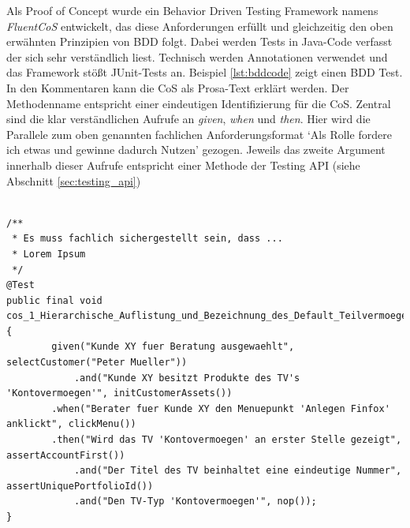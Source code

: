 Als Proof of Concept wurde ein Behavior Driven Testing Framework namens \textit{FluentCoS} entwickelt, das diese Anforderungen erfüllt und gleichzeitig den oben erwähnten Prinzipien von \Gls{BDD} folgt. Dabei werden Tests in Java-Code verfasst der sich sehr verständlich liest. Technisch werden Annotationen verwendet und das Framework stößt JUnit-Tests an. Beispiel \ref{lst:bddcode} zeigt einen \Gls{BDD} Test. In den Kommentaren kann die \Gls{CoS} als Prosa-Text erklärt werden. Der Methodenname entspricht einer eindeutigen Identifizierung für die CoS. Zentral sind die klar verständlichen Aufrufe an \textit{given}, \textit{when} und \textit{then}. Hier wird die Parallele zum oben genannten fachlichen Anforderungsformat `Als Rolle fordere ich etwas und gewinne dadurch Nutzen' gezogen. Jeweils das zweite Argument innerhalb dieser Aufrufe entspricht einer Methode der Testing API (siehe Abschnitt \ref{sec:testing_api})

\begin{lstlisting}[caption={Beispielhaftes Codestück eines \Gls{BDD} Tests},label=lst:bddcode]

/**
 * Es muss fachlich sichergestellt sein, dass ...
 * Lorem Ipsum
 */
@Test
public final void cos_1_Hierarchische_Auflistung_und_Bezeichnung_des_Default_Teilvermoegens_Kontovermoegen() {
		given("Kunde XY fuer Beratung ausgewaehlt", selectCustomer("Peter Mueller"))
			.and("Kunde XY besitzt Produkte des TV's 'Kontovermoegen'", initCustomerAssets())
		.when("Berater fuer Kunde XY den Menuepunkt 'Anlegen Finfox' anklickt", clickMenu())
		.then("Wird das TV 'Kontovermoegen' an erster Stelle gezeigt", assertAccountFirst())
			.and("Der Titel des TV beinhaltet eine eindeutige Nummer", assertUniquePortfolioId())
			.and("Den TV-Typ 'Kontovermoegen'", nop());
}
\end{lstlisting}

